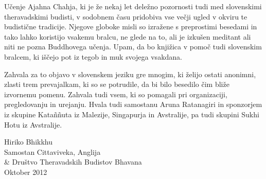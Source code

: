 
Učenje Ajahna Chahja, ki je že nekaj let deležno pozornosti tudi med slovenskimi theravadskimi budisti, v sodobnem času pridobiva vse večji ugled v okviru te budistične tradicije. Njegove globoke misli so izražene s preprostimi besedami in tako lahko koristijo vsakemu bralcu, ne glede na to, ali je izkušen meditant ali niti ne pozna Buddhovega učenja. Upam, da bo knjižica v pomoč tudi slovenskim bralcem, ki iščejo pot iz tegob in muk svojega vsakdana.

Zahvala za to objavo v slovenskem jeziku gre mnogim, ki želijo ostati anonimni, zlasti trem prevajalkam, ki so se potrudile, da bi bilo besedilo čim bliže izvornemu pomenu. Zahvala tudi vsem, ki so pomagali pri organizaciji, pregledovanju in urejanju. Hvala tudi samostanu Aruna Ratanagiri in sponzorjem iz skupine Kataññuta iz Malezije, Singapurja in Avstralije, pa tudi skupini Sukhi Hotu iz Avstralije.


\bigskip
{\par\raggedleft
Hiriko Bhikkhu\\
Samostan Cittaviveka, Anglija\\
\& Društvo Theravadskih Budistov Bhavana\\
Oktober 2012
\par}
